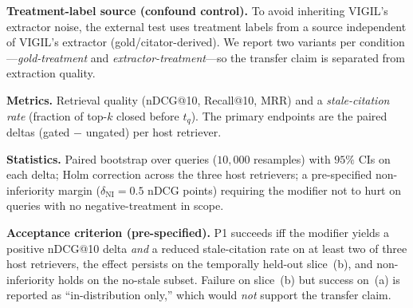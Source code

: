 \textbf{Treatment-label source (confound control).} To avoid inheriting VIGIL's extractor noise, the external test uses treatment labels from a source independent of VIGIL's extractor (gold/citator-derived). We report two variants per condition---\emph{gold-treatment} and \emph{extractor-treatment}---so the transfer claim is separated from extraction quality.

\textbf{Metrics.} Retrieval quality (nDCG@10, Recall@10, MRR) and a \emph{stale-citation rate} (fraction of top-$k$ closed before $t_q$). The primary endpoints are the paired deltas (gated $-$ ungated) per host retriever.

\textbf{Statistics.} Paired bootstrap over queries ($10{,}000$ resamples) with $95\%$ CIs on each delta; Holm correction across the three host retrievers; a pre-specified non-inferiority margin ($\delta_{\text{NI}}=0.5$ nDCG points) requiring the modifier not to hurt on queries with no negative-treatment in scope.

\textbf{Acceptance criterion (pre-specified).} P1 succeeds iff the modifier yields a positive nDCG@10 delta \emph{and} a reduced stale-citation rate on at least two of three host retrievers, the effect persists on the temporally held-out slice~(b), and non-inferiority holds on the no-stale subset. Failure on slice~(b) but success on~(a) is reported as ``in-distribution only,'' which would \emph{not} support the transfer claim.

